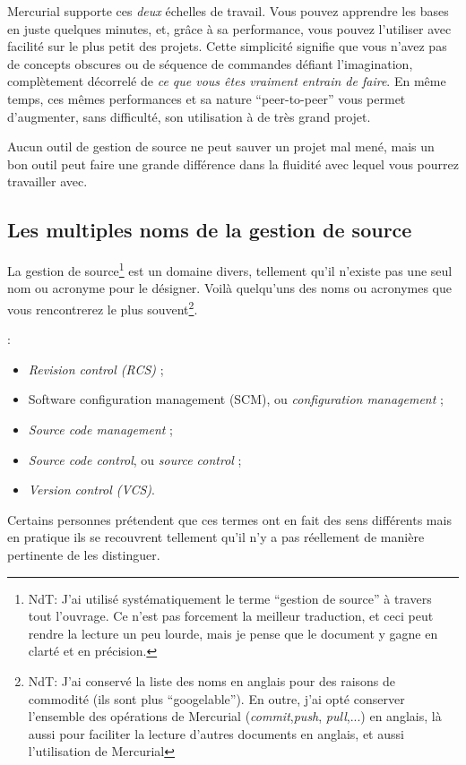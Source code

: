 Mercurial supporte ces \emph{deux} échelles de travail. Vous pouvez apprendre
les bases en juste quelques minutes, et, grâce à sa performance, vous pouvez
l'utiliser avec facilité sur le plus petit des projets. Cette simplicité 
signifie que vous n'avez pas de concepts obscures ou de séquence de commandes
défiant l'imagination, complètement décorrelé de \emph{ce que vous êtes 
vraiment entrain de faire}. En même temps, ces mêmes performances et sa 
nature ``peer-to-peer'' vous permet d'augmenter, sans difficulté, son 
utilisation à de très grand projet.

Aucun outil de gestion de source ne peut sauver un projet mal mené, mais un
bon outil peut faire une grande différence dans la fluidité avec lequel 
vous pourrez travailler avec.

\subsection{Les multiples noms de la gestion de source}

La gestion de source\footnote{NdT: J'ai utilisé systématiquement le terme ``gestion de source'' à travers tout l'ouvrage. Ce n'est pas forcement la meilleur traduction, et ceci peut rendre la lecture un peu lourde, mais je pense que le document y gagne en clarté et en précision.} est un domaine divers, tellement qu'il n'existe pas
une seul nom ou acronyme pour le désigner. Voilà quelqu'uns des noms ou 
acronymes que vous rencontrerez le plus souvent\footnote{NdT: J'ai conservé la liste des noms en anglais pour des raisons de commodité (ils sont plus ``googelable''). En outre, j'ai opté  conserver l'ensemble des opérations de Mercurial (\textit{commit},\textit{push}, \textit{pull},...) en anglais, là aussi pour faciliter la lecture d'autres documents en anglais, et aussi l'utilisation de Mercurial}.

:
\begin{itemize}
\item \textit{Revision control (RCS)} ;
\item Software configuration management (SCM), ou \textit{configuration management} ;
\item \textit{Source code management} ;
\item \textit{Source code control}, ou \textit{source control} ;
\item \textit{Version control (VCS)}.
\end{itemize}

Certains personnes prétendent que ces termes ont en fait des sens
différents mais en pratique ils se recouvrent tellement qu'il n'y a pas
réellement de manière pertinente de les distinguer.

